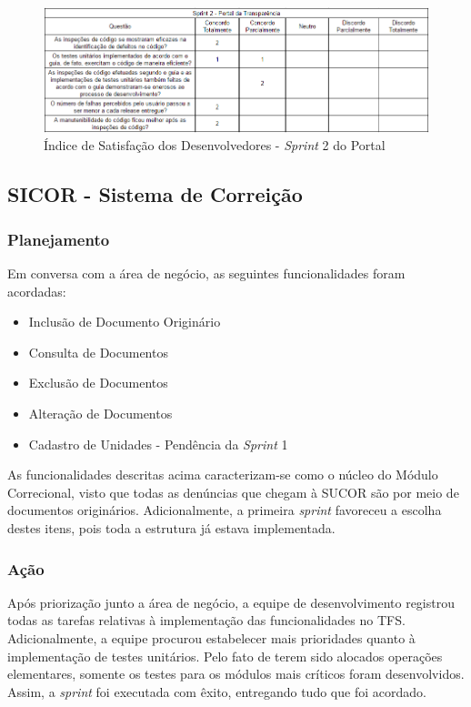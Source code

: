 \begin{figure}[h]
\includegraphics[width=\textwidth]{figuras/isd_portal_2.png}
\caption{Índice de Satisfação dos Desenvolvedores - \textit{Sprint} 2 do Portal}
\label{fig:satisfacaoPortal2}
\end{figure}

\clearpage

\subsection{SICOR - Sistema de Correição}

\subsubsection{Planejamento}

Em conversa com a área de negócio, as seguintes funcionalidades foram acordadas:

\begin{itemize}
	\item {Inclusão de Documento Originário}
	\item {Consulta de Documentos}
	\item {Exclusão de Documentos}
	\item {Alteração de Documentos}
	\item {Cadastro de Unidades - Pendência da \textit{Sprint} 1}
\end{itemize}

As funcionalidades descritas acima caracterizam-se como o núcleo do Módulo Correcional, visto que todas as denúncias que chegam à SUCOR são por meio de documentos originários. Adicionalmente, a primeira \textit{sprint} favoreceu a escolha destes itens, pois toda a estrutura já estava implementada.

\subsubsection{Ação}

Após priorização junto a área de negócio, a equipe de desenvolvimento registrou todas as tarefas relativas à implementação das funcionalidades no TFS. Adicionalmente, a equipe procurou estabelecer mais prioridades quanto à implementação de testes unitários. Pelo fato de terem sido alocados operações elementares, somente os testes para os módulos mais críticos foram desenvolvidos. Assim, a \textit{sprint} foi executada com êxito, entregando tudo que foi acordado.

